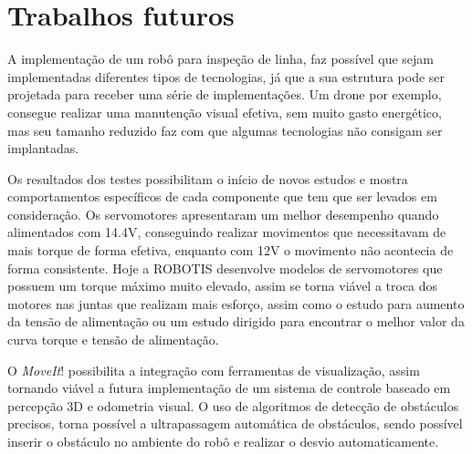 %

\section{Trabalhos futuros}
\label{sec:trabfut}
A implementação de um robô para inspeção de linha, faz possível que sejam implementadas diferentes tipos de tecnologias, já que a sua estrutura pode ser projetada para receber uma série de implementações. Um drone por exemplo, consegue realizar uma manutenção visual efetiva, sem muito gasto energético, mas seu tamanho reduzido faz com que algumas tecnologias não consigam ser implantadas.

Os resultados dos testes possibilitam o início de novos estudos e mostra comportamentos específicos de cada componente que tem que ser levados em consideração. Os servomotores apresentaram um melhor desempenho quando alimentados com 14.4V, conseguindo realizar movimentos que necessitavam de mais torque de forma efetiva, enquanto com 12V o movimento não acontecia de forma consistente. Hoje a ROBOTIS desenvolve modelos de servomotores que possuem um torque máximo muito elevado, assim se torna viável a troca dos motores nas juntas que realizam mais esforço, assim como o estudo para aumento da tensão de alimentação ou um estudo dirigido para encontrar o melhor valor da curva torque e tensão de alimentação.

O \textit{MoveIt}! possibilita a integração com ferramentas de visualização, assim tornando viável a futura implementação de um sistema de controle baseado em percepção 3D e odometria visual. O uso de algoritmos de detecção de obstáculos precisos, torna possível a ultrapassagem automática de obstáculos, sendo possível inserir o obstáculo no ambiente do robô e realizar o desvio automaticamente.







